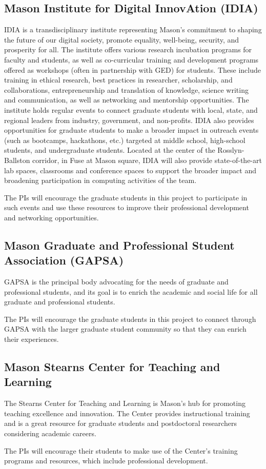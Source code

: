 \documentclass[11pt]{article}
\begin{document}
\subsection*{Mason Institute for Digital InnovAtion (IDIA)} IDIA is a transdisciplinary institute representing Mason’s commitment to shaping the future of our digital society, promote equality, well-being, security, and prosperity for all. The institute offers various research incubation programs for faculty and students, as well as co-curricular training and development programs offered as workshops (often in partnership with GED) for students. These include training in ethical research, best practices in researcher, scholarship, and collaborations, entrepreneurship and translation of knowledge, science writing and communication, as well as networking and mentorship opportunities. The institute holds regular events to connect graduate students with local, state, and regional leaders from industry, government, and non-profits. IDIA also provides opportunities for graduate students to make a broader impact in outreach events (such as bootcamps, hackathons, etc.) targeted at middle school, high-school students, and undergraduate students. Located at the center of the Rosslyn-Ballston corridor, in Fuse at Mason square, IDIA will also provide state-of-the-art lab spaces, classrooms and conference spaces to support the broader impact and broadening participation in computing activities of the team.

The PIs will encourage the graduate students in this project to participate in such events and use these resources to improve their professional development and networking opportunities.

\subsection*{Mason Graduate and Professional Student Association (GAPSA)}  GAPSA is the principal body advocating for the needs of graduate and professional students, and its goal is to enrich the academic and social life for all graduate and professional students.

The PIs will encourage the graduate students in this project to connect through GAPSA with the larger graduate student community so that they can enrich their experiences.

\subsection*{Mason Stearns Center for Teaching and Learning} The Stearns Center for Teaching and Learning is Mason’s hub for promoting teaching excellence and innovation. The Center provides instructional training and is a great resource for graduate students and postdoctoral researchers considering academic careers.

The PIs will encourage their students to make use of the Center's training programs and resources, which include professional development.
\end{document}
